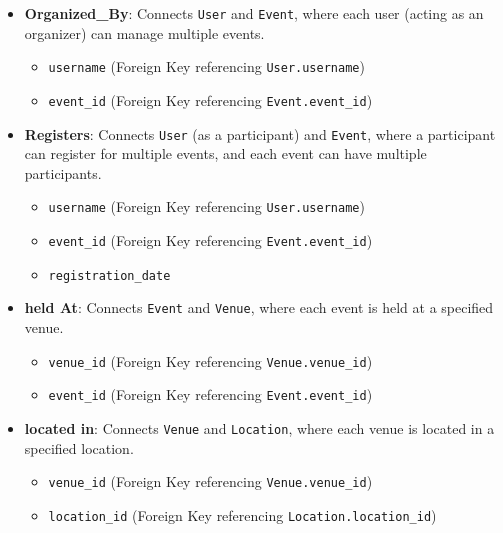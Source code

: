\begin{itemize}
    \item \textbf{Organized\_By}: Connects \texttt{User} and \texttt{Event}, where each user (acting as an organizer) can manage multiple events.
    \begin{itemize}
        \item \texttt{username} (Foreign Key referencing \texttt{User.username})
        \item \texttt{event\_id} (Foreign Key referencing \texttt{Event.event\_id})
    \end{itemize}

    \item \textbf{Registers}: Connects \texttt{User} (as a participant) and \texttt{Event}, where a participant can register for multiple events, and each event can have multiple participants.
    \begin{itemize}
        \item \texttt{username} (Foreign Key referencing \texttt{User.username})
        \item \texttt{event\_id} (Foreign Key referencing \texttt{Event.event\_id})
        \item \texttt{registration\_date}
    \end{itemize}

    \item \textbf{held At}: Connects \texttt{Event} and \texttt{Venue}, where each event is held at a specified venue.
    \begin{itemize}
        \item \texttt{venue\_id} (Foreign Key referencing \texttt{Venue.venue\_id})
        \item \texttt{event\_id} (Foreign Key referencing \texttt{Event.event\_id})
    \end{itemize}
    \item \textbf{located in}: Connects \texttt{Venue} and \texttt{Location}, where each venue is located in a specified location.
    \begin{itemize}
        \item \texttt{venue\_id} (Foreign Key referencing \texttt{Venue.venue\_id})
        \item \texttt{location\_id} (Foreign Key referencing \texttt{Location.location\_id})
    \end{itemize}
\end{itemize}
\newpage
